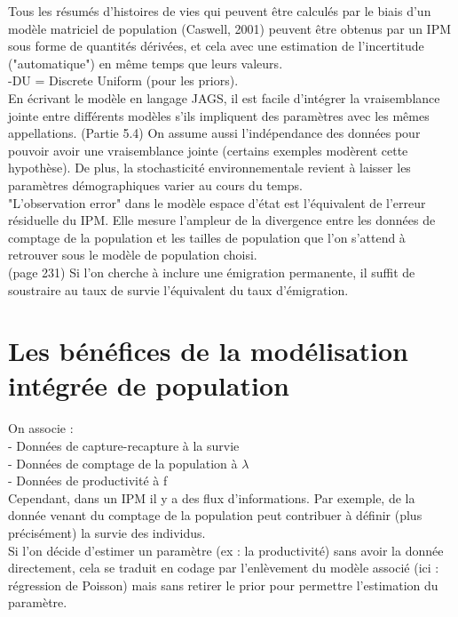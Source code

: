 \documentclass[12pt,a4paper]{article}
\begin{document}
Tous les résumés d'histoires de vies qui peuvent être calculés par le biais d'un modèle matriciel de population (Caswell, 2001) peuvent être obtenus par un IPM sous forme de quantités dérivées, et cela avec une estimation de l'incertitude ("automatique") en même temps que leurs valeurs.\\
-DU = Discrete Uniform (pour les priors).\\
En écrivant le modèle en langage JAGS, il est facile d'intégrer la vraisemblance jointe entre différents modèles s'ils impliquent des paramètres avec les mêmes appellations. (Partie 5.4) On assume aussi l'indépendance des données pour pouvoir avoir une vraisemblance jointe (certains exemples modèrent cette hypothèse). De plus, la stochasticité environnementale revient à laisser les paramètres démographiques varier au cours du temps.\\
"L'observation error" dans le modèle espace d'état est l'équivalent de l'erreur résiduelle du IPM. Elle mesure l'ampleur de la divergence entre les données de comptage de la population et les tailles de population que l'on s'attend à retrouver sous le modèle de population choisi.\\
(page 231) Si l'on cherche à inclure une émigration permanente, il suffit de soustraire au taux de survie l'équivalent du taux d'émigration.

\section{Les bénéfices de la modélisation intégrée de population}
On associe : \\
- Données de capture-recapture à la survie\\
- Données de comptage de la population à $\lambda$\\
- Données de productivité à f\\
Cependant, dans un IPM il y a des flux d'informations. Par exemple, de la donnée venant du comptage de la population peut contribuer à définir (plus précisément) la survie des individus.\\
Si l'on décide d'estimer un paramètre (ex : la productivité) sans avoir la donnée directement, cela se traduit en codage par l'enlèvement du modèle associé (ici : régression de Poisson) mais sans retirer le prior pour permettre l'estimation du paramètre.
\end{document}
